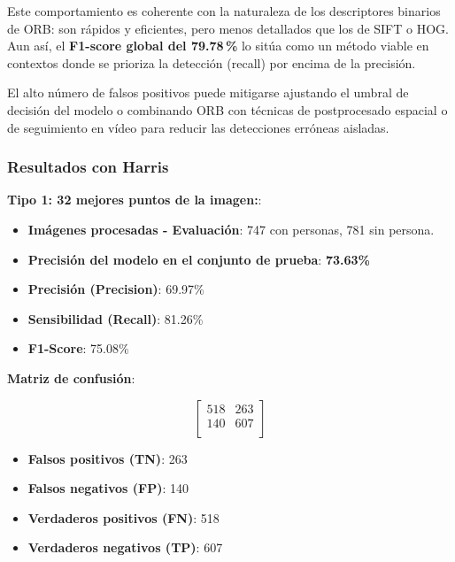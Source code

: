 \documentclass[a4paper]{article}
\begin{document}
\par\vspace{0.3cm}
Este comportamiento es coherente con la naturaleza de los descriptores binarios de ORB: son rápidos y eficientes, pero menos detallados que los de SIFT o HOG. Aun así, el \textbf{F1-score global del 79.78\,\%} lo sitúa como un método viable en contextos donde se prioriza la detección (recall) por encima de la precisión.

\par\vspace{0.3cm}
El alto número de falsos positivos puede mitigarse ajustando el umbral de decisión del modelo o combinando ORB con técnicas de postprocesado espacial o de seguimiento en vídeo para reducir las detecciones erróneas aisladas.


\vspace{0.5cm}
\subsubsection*{Resultados con Harris}
\textbf{Tipo 1: 32 mejores puntos de la imagen:}:

\begin{itemize}
    \item \textbf{Imágenes procesadas - Evaluación}: 747 con personas, 781 sin persona.
    \item \textbf{Precisión del modelo en el conjunto de prueba}: \textbf{73.63\%}
    \item \textbf{Precisión (Precision)}: 69.97\%
    \item \textbf{Sensibilidad (Recall)}: 81.26\%
    \item \textbf{F1-Score}: 75.08\%
\end{itemize}

\textbf{Matriz de confusión}:

\[
\begin{bmatrix}
    518 & 263 \\
    140 & 607 \\
\end{bmatrix}
\]

\begin{itemize}
    \item \textbf{Falsos positivos (TN)}: 263
    \item \textbf{Falsos negativos (FP)}: 140
    \item \textbf{Verdaderos positivos (FN)}: 518
    \item \textbf{Verdaderos negativos (TP)}: 607
\end{itemize}
\end{document}
